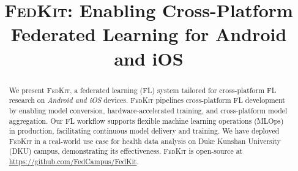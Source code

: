 \documentclass[conference]{IEEEtran}
\begin{document}

\newcommand*\circled[1]{\tikz[baseline=(char.base)]{
        \node[shape=circle,draw,inner sep=.6pt] (char) {#1};}}
\newcommand{\FedCampus}{\textsc{FedCampus}}
\newcommand{\FedKit}{\textsc{FedKit}}
\newcommand{\challa}{\textbf{(a)}}
\newcommand{\challb}{\textbf{(b)}}
\newcommand{\challc}{\textbf{(c)}}

\title
{\FedKit{}: Enabling Cross-Platform Federated Learning for Android and iOS}

\author{
}

\maketitle

\begin{abstract}
We present \FedKit{}, a federated learning (FL) system tailored for
cross-platform FL research on \textit{Android and iOS} devices.
\FedKit{} pipelines cross-platform FL development by
enabling model conversion,
hardware-accelerated training,
and cross-platform model aggregation.
Our FL workflow supports flexible machine learning operations (MLOps) in production,
facilitating continuous model delivery and training.
We have deployed \FedKit{} in a real-world use case for
health data analysis on Duke Kunshan University (DKU) campus,
demonstrating its effectiveness.
\FedKit{} is open-source at \url{https://github.com/FedCampus/FedKit}.
\end{abstract}
\end{document}
